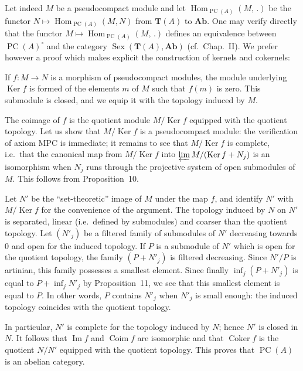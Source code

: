 Let indeed $M$ be a pseudocompact module and let
$\operatorname{Hom}_{\operatorname{PC}(A)}(M,\,.)$ be the functor
$N\mapsto\operatorname{Hom}_{\operatorname{PC}(A)}(M,N)$ from
$\mathbf{T}(A)$ to $\mathbf{Ab}$. One may verify directly that the
functor $M\mapsto\operatorname{Hom}_{\operatorname{PC}(A)}(M,\,.)$
defines an equivalence between $\operatorname{PC}(A)^\circ$ and the
category $\operatorname{Sex}(\mathbf{T}(A),\mathbf{Ab})$ (cf.\
Chap.~II). We prefer however a proof which makes explicit the
construction of kernels and cokernels:

If $f\colon M\to N$ is a morphism of pseudocompact modules, the module
underlying $\operatorname{Ker}f$ is formed of the elements $m$ of $M$
such that $f(m)$ is zero. This submodule is closed, and we equip it
with the topology induced by $M$.

The coimage of $f$ is the quotient module $M/\operatorname{Ker}f$
equipped with the quotient topology. Let us show that
$M/\operatorname{Ker}f$ is a pseudocompact module: the verification of
axiom MPC is immediate; it remains to see that
$M/\operatorname{Ker}f$ is complete, i.e.\ that the canonical map from
$M/\operatorname{Ker}f$ into
$\varprojlim M/(\operatorname{Ker}f+N_j)$ is an isomorphism when $N_j$
runs through the projective system of open submodules of $M$. This
follows from Proposition~10.

Let $N'$ be the ``set-theoretic'' image of $M$ under the map $f$, and
identify $N'$ with $M/\operatorname{Ker}f$ for the convenience of the
argument. The topology induced by $N$ on $N'$ is separated, linear
(i.e.\ defined by submodules) and coarser than the quotient topology.
Let $(N'_j)$ be a filtered family of submodules of $N'$ decreasing
towards $0$ and open for the induced topology. If $P$ is a submodule
of $N'$ which is open for the quotient topology, the family
$(P+N'_j)$ is filtered decreasing. Since $N'/P$ is artinian, this
family possesses a smallest element. Since finally
$\inf_j(P+N'_j)$ is equal to $P+\inf_j N'_j$ by Proposition~11, we see
that this smallest element is equal to $P$. In other words, $P$
contains $N'_j$ when $N'_j$ is small enough: the induced topology
coincides with the quotient topology.

In particular, $N'$ is complete for the topology induced by $N$; hence
$N'$ is closed in $N$. It follows that $\operatorname{Im}f$ and
$\operatorname{Coim}f$ are isomorphic and that
$\operatorname{Coker}f$ is the quotient $N/N'$ equipped with the
quotient topology. This proves that $\operatorname{PC}(A)$ is an
abelian category.

